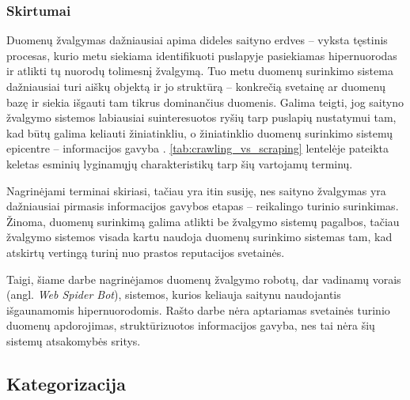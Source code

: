 \subsubsection{Skirtumai}

Duomenų žvalgymas dažniausiai apima dideles saityno erdves -- vyksta tęstinis procesas, kurio metu siekiama identifikuoti puslapyje pasiekiamas hipernuorodas ir atlikti tų nuorodų tolimesnį žvalgymą. Tuo metu duomenų surinkimo sistema dažniausiai turi aiškų objektą ir jo struktūrą -- konkrečią svetainę ar duomenų bazę ir siekia išgauti tam tikrus dominančius duomenis. Galima teigti, jog saityno žvalgymo sistemos labiausiai suinteresuotos ryšių tarp puslapių nustatymui tam, kad būtų galima keliauti žiniatinkliu, o žiniatinklio duomenų surinkimo sistemų epicentre -- informacijos gavyba \cite{OxylabsScrapingVsCrawling}. \ref{tab:crawling_vs_scraping} lentelėje pateikta keletas esminių lyginamųjų charakteristikų tarp šių vartojamų terminų.


Nagrinėjami terminai skiriasi, tačiau yra itin susiję, nes saityno žvalgymas yra dažniausiai pirmasis informacijos gavybos etapas -- reikalingo turinio surinkimas. Žinoma, duomenų surinkimą galima atlikti be žvalgymo sistemų pagalbos, tačiau žvalgymo sistemos visada kartu naudoja duomenų surinkimo sistemas tam, kad atskirtų vertingą turinį nuo prastos reputacijos svetainės. \cite{OxylabsScrapingVsCrawling}

Taigi, šiame darbe nagrinėjamos duomenų žvalgymo robotų, dar vadinamų vorais (angl. \textit{Web Spider Bot}), sistemos, kurios keliauja saitynu naudojantis išgaunamomis hipernuorodomis. Rašto darbe nėra aptariamas svetainės turinio duomenų apdorojimas, struktūrizuotos informacijos gavyba, nes tai nėra šių sistemų atsakomybės sritys.

\subsection{Kategorizacija}